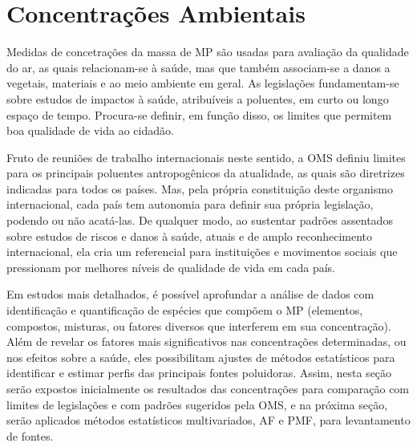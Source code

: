 \newpage
\section{Concentrações Ambientais}

%
%
Medidas de concetrações da massa de MP são usadas para avaliação da qualidade do
ar, as quais relacionam-se à saúde, mas que também associam-se a danos a 
vegetais, materiais e ao meio ambiente em geral. As legislações fundamentam-se 
sobre estudos de impactos à saúde, atribuíveis a poluentes, em curto ou longo 
espaço de tempo. Procura-se definir, em função disso, os limites que permitem 
boa qualidade de vida ao cidadão.

Fruto de reuniões de trabalho internacionais neste sentido, a OMS 
 definiu limites para os principais poluentes antropogênicos 
da atualidade, as quais são diretrizes indicadas para todos os países. Mas, 
pela própria constituição deste organismo internacional, cada país tem autonomia
para definir sua própria legislação, podendo ou não acatá-las. De qualquer modo,
ao sustentar padrões assentados sobre estudos de riscos e danos à saúde, atuais 
e de amplo reconhecimento internacional, ela cria um referencial para 
instituições e movimentos sociais que pressionam por melhores níveis de 
qualidade de vida em cada país.

Em estudos mais detalhados, é possível aprofundar a análise de dados com 
identificação e quantificação de espécies que compõem o MP (elementos, 
compostos, misturas, ou fatores diversos que interferem em sua concentração). 
Além de revelar os fatores mais significativos nas concentrações determinadas, 
ou nos efeitos sobre a saúde, eles possibilitam ajustes de métodos estatísticos 
para identificar e estimar perfis das principais fontes poluidoras. Assim, nesta
seção serão expostos inicialmente os resultados das concentrações para 
comparação com limites de legislações e com padrões sugeridos pela OMS, e na 
próxima seção, serão aplicados métodos 
estatísticos multivariados, AF e PMF, para levantamento de fontes. 

